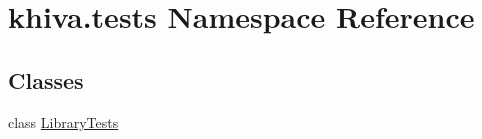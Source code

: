 \hypertarget{namespacekhiva_1_1tests}{}\section{khiva.\+tests Namespace Reference}
\label{namespacekhiva_1_1tests}
\subsection*{Classes}
\begin{DoxyCompactItemize}
\item 
class \mbox{\hyperlink{classkhiva_1_1tests_1_1_library_tests}{Library\+Tests}}
\end{DoxyCompactItemize}
